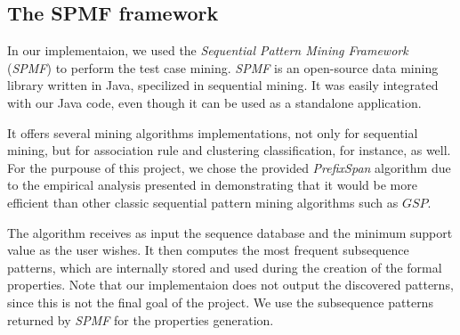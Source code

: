 \subsection{The SPMF framework}
\label{sec-spmf}

In our implementaion, we used the \textit{Sequential Pattern Mining Framework} (\textit{SPMF})\cite{spmf} to perform the test case mining. \textit{SPMF} is an open-source data mining library written in Java, specilized in sequential mining. It was easily integrated with our Java code, even though it can be used as a standalone application.

It offers several mining algorithms implementations, not only for sequential mining, but for association rule and clustering classification, for instance, as well. For the purpouse of this project, we chose the provided \textit{PrefixSpan} algorithm due to the empirical analysis presented in \cite{Pei} demonstrating that it would be more efficient than other classic sequential pattern mining algorithms such as $GSP$.

The algorithm receives as input the sequence database and the minimum support value as the user wishes. It then computes the most frequent subsequence patterns, which are internally stored and used during the creation of the formal properties. Note that our implementaion does not output the discovered patterns, since this is not the final goal of the project. We use the subsequence patterns returned by \textit{SPMF} for the properties generation. 


